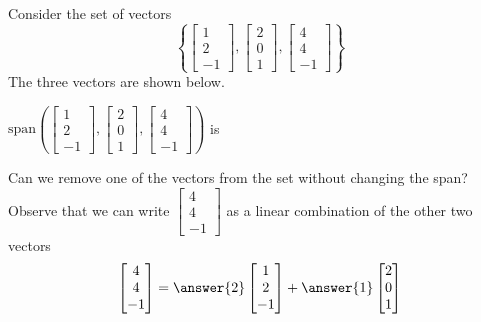 \documentclass{ximera}
\begin{document}
\begin{exploration}\label{exp:redundantVecs2}
    Consider the set of vectors $$\left\{\begin{bmatrix}1\\2\\-1\end{bmatrix},\begin{bmatrix}2\\0\\1\end{bmatrix},\begin{bmatrix}4\\4\\-1\end{bmatrix}\right\}$$
The three vectors are shown below.
\begin{center}
\end{center}
$\mbox{span}\left(\begin{bmatrix}1\\2\\-1\end{bmatrix},\begin{bmatrix}2\\0\\1\end{bmatrix},\begin{bmatrix}4\\4\\-1\end{bmatrix}\right)$ is 

Can we remove one of the vectors from the set without changing the span?  Observe that we can write $\begin{bmatrix}4\\4\\-1\end{bmatrix}$ as a linear combination of the other two vectors
 \begin{equation}\label{eq:redundant}\begin{bmatrix}4\\4\\-1\end{bmatrix}=\answer{2}\begin{bmatrix}1\\2\\-1\end{bmatrix}+\answer{1}\begin{bmatrix}2\\0\\1\end{bmatrix}\end{equation}


\end{exploration}
\end{document}
